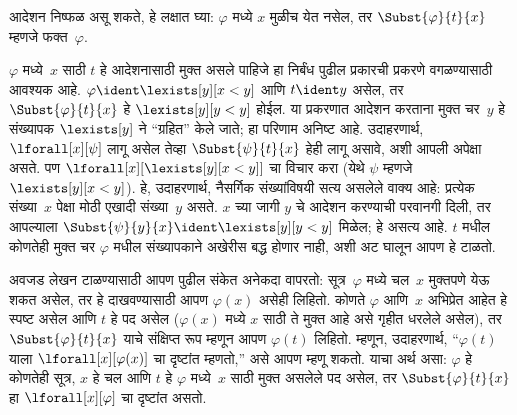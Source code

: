 \begin{explain}
आदेशन निष्फळ असू शकते, हे लक्षात घ्या: $\varphi$ मध्ये $x$ मुळीच येत नसेल,
तर $\Subst{\varphi}{t}{x}$ म्हणजे फक्त~$\varphi$.

$\varphi$ मध्ये~$x$ साठी $t$ हे आदेशनासाठी मुक्त असले पाहिजे हा निर्बंध पुढील
प्रकारची प्रकरणे वगळण्यासाठी आवश्यक आहे. $\varphi \ident
\lexists[y][x < y]$ आणि $t \ident y$ असेल, तर
$\Subst{\varphi}{t}{x}$ हे $\lexists[y][y < y]$ होईल. या प्रकरणात आदेशन
करताना मुक्त चर~$y$ हे संख्यापक $\lexists[y]$ ने ``ग्रहित'' केले जाते;
हा परिणाम अनिष्ट आहे. उदाहरणार्थ, $\lforall[x][\psi]$ लागू असेल तेव्हा
$\Subst{\psi}{t}{x}$ हेही लागू असावे, अशी आपली अपेक्षा असते. पण
$\lforall[x][\lexists[y][x < y]]$ चा विचार करा (येथे $\psi$ म्हणजे
$\lexists[y][x < y]$). हे, उदाहरणार्थ, नैसर्गिक संख्यांविषयी सत्य
असलेले वाक्य आहे: प्रत्येक संख्या~$x$ पेक्षा मोठी एखादी संख्या~$y$
असते. $x$ च्या जागी $y$ चे आदेशन करण्याची परवानगी दिली, तर आपल्याला
$\Subst{\psi}{y}{x} \ident \lexists[y][y < y]$ मिळेल; हे असत्य आहे.
$t$ मधील कोणतेही मुक्त चर $\varphi$ मधील संख्यापकाने अखेरीस बद्ध होणार नाही,
अशी अट घालून आपण हे टाळतो.
\end{explain}

अवजड लेखन टाळण्यासाठी आपण पुढील संकेत अनेकदा वापरतो: सूत्र~$\varphi$
मध्ये चल~$x$ मुक्तपणे येऊ शकत असेल, तर हे दाखवण्यासाठी आपण
$\varphi(x)$ असेही लिहितो. कोणते $\varphi$ आणि~$x$ अभिप्रेत आहेत हे स्पष्ट असेल
आणि $t$ हे पद असेल ($\varphi(x)$ मध्ये $x$ साठी ते मुक्त आहे असे गृहीत
धरलेले असेल), तर $\Subst{\varphi}{t}{x}$ याचे संक्षिप्त रूप म्हणून आपण
$\varphi(t)$ लिहितो. म्हणून, उदाहरणार्थ, ``$\varphi(t)$ याला
$\lforall[x][\varphi(x)]$ चा दृष्टांत म्हणतो,'' असे आपण म्हणू शकतो. याचा
अर्थ असा: $\varphi$ हे कोणतेही सूत्र, $x$ हे चल आणि $t$ हे
$\varphi$ मध्ये~$x$ साठी मुक्त असलेले पद असेल, तर
$\Subst{\varphi}{t}{x}$ हा $\lforall[x][\varphi]$ चा दृष्टांत असतो.



